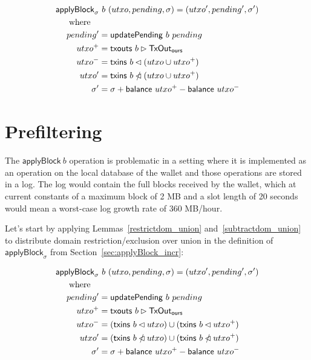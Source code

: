 \documentclass{article}
\newcommand{\restrictdom}{\lhd}
\newcommand{\subtractdom}{\mathbin{\slashed{\restrictdom}}}
\newcommand{\restrictrange}{\rhd}
\begin{document}
\begin{equation*}
\begin{split}
\mathsf{applyBlock}_\sigma & ~ b ~ (utxo, pending, \sigma) = (utxo^\prime, pending^\prime, \sigma^\prime) \\
\text{where} \quad \\
    pending^\prime & = \mathsf{updatePending} ~ b ~ pending \\
    utxo^+ & = \mathsf{txouts} ~ b \restrictrange \mathsf{TxOut_{ours}} \\
    utxo^- & = \mathsf{txins} ~ b \restrictdom (utxo \cup utxo^+) \\
    utxo^\prime & = \mathsf{txins} ~ b \subtractdom (utxo \cup utxo^+) \\
    \sigma^\prime & = \sigma + \mathsf{balance} ~ utxo^+ - \mathsf{balance} ~ utxo^- \\
\end{split}
\end{equation*}

\section{Prefiltering}
\label{sec:prefiltering}

The $\mathsf{applyBlock} ~ b$ operation is problematic in a setting where it is
implemented as an operation on the local database of the wallet and those
operations are stored in a log. The log would contain the full blocks received
by the wallet, which at current constants of a maximum block of 2 MB and a slot
length of 20 seconds would mean a worst-case log growth rate of 360 MB/hour.

Let's start by applying Lemmas~\ref{restrictdom_union}
and~\ref{subtractdom_union} to distribute domain restriction/exclusion over
union in the definition of $\mathsf{applyBlock}_\sigma$ from
Section~\ref{sec:applyBlock_incr}:

\begin{equation*}
\begin{split}
\mathsf{applyBlock}_\sigma & ~ b ~ (utxo, pending, \sigma) = (utxo^\prime, pending^\prime, \sigma^\prime) \\
\text{where} \quad \\
    pending^\prime & = \mathsf{updatePending} ~ b ~ pending \\
    utxo^+ & = \mathsf{txouts} ~ b \restrictrange \mathsf{TxOut_{ours}} \\
    utxo^- & = (\mathsf{txins} ~ b \restrictdom utxo) \cup (\mathsf{txins} ~ b \restrictdom utxo^+) \\
    utxo^\prime & = (\mathsf{txins} ~ b \subtractdom utxo) \cup (\mathsf{txins} ~ b \subtractdom utxo^+) \\
    \sigma^\prime & = \sigma + \mathsf{balance} ~ utxo^+ - \mathsf{balance} ~ utxo^- \\
\end{split}
\end{equation*}
\end{document}
